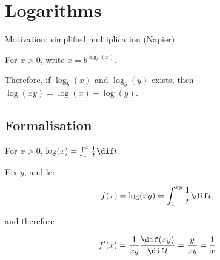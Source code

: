 \documentclass[11pt]{scrartcl}
\begin{document}
\section{Logarithms}

Motivation: simplified multiplication (Napier)

For $x>0$, write $x = b^{\log_b(x)}$.

Therefore, if $\log_b(x)$ and $\log_b(y)$ exists, then $\log(xy) = \log(x) + \log(y)$.

\subsection{Formalisation}

\begin{definition}
  For $x>0$, $\log(x) = \int_1^x \frac{1}{t}\dif t$.
\end{definition}

Fix $y$, and let


\begin{equation*}
  f(x) = \log(xy) = \int_1^{xy}\frac{1}{t}\dif t, 
\end{equation*}

and therefore

\begin{equation*}
  f'(x) = \frac{1}{xy}\frac{\dif (xy)}{\dif t}  = \frac{y}{xy} = \frac{1}{x}
\end{equation*}
\end{document}
